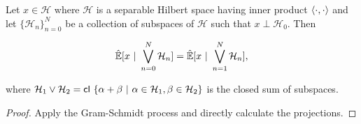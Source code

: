 \documentclass[12pt]{article}
\def\H{\mathcal{H}}  %
\newcommand{\linE}[2]{\hat{\E}[#1\ |\ #2]}  %
\begin{document}

  

\begin{lemma}
  \label{lem:subspace_sum_projection}
  Let $x \in \H$ where $\H$ is a separable Hilbert space having inner product
  $\langle \cdot, \cdot \rangle$ and let $\{\H_n\}_{n = 0}^N$ be a
  collection of subspaces of $\H$ such that $x \perp \H_0$.  Then

  \begin{equation*}
    \linE{x}{\bigvee_{n = 0}^N\H_n} = \linE{x}{\bigvee_{n = 1}^N\H_n},
  \end{equation*}

  where
  $\H_1 \vee \H_2 = \cl \{\alpha + \beta\ |\ \alpha \in \H_1, \beta
  \in \H_2 \}$ is the closed sum of subspaces.
\end{lemma}
\begin{proof}
  Apply the Gram-Schmidt process and directly calculate the projections.
\end{proof}  
\end{document}

